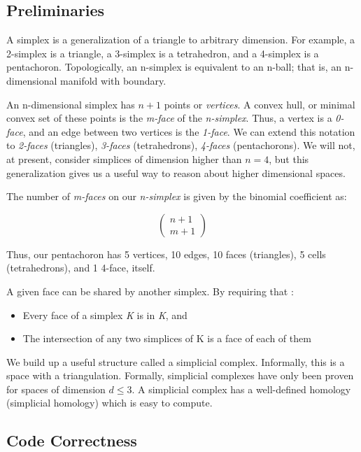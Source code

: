 \documentclass{article}
\begin{document}
\subsection{Preliminaries}

A simplex is a generalization of a triangle to arbitrary dimension. For example, a 2-simplex is a triangle, a 3-simplex is a tetrahedron, and a 4-simplex is a pentachoron. Topologically, an n-simplex is equivalent to an n-ball; that is, an n-dimensional manifold with boundary.

An n-dimensional simplex has $n+1$ points or \emph{vertices}. A convex hull, or minimal convex set of these points is the \emph{m-face} of the \emph{n-simplex}. Thus, a vertex is a \emph{0-face}, and an edge between two vertices is the \emph{1-face}. We can extend this notation to \emph{2-faces} (triangles), \emph{3-faces} (tetrahedrons), \emph{4-faces} (pentachorons). We will not, at present, consider simplices of dimension higher than $n=4$, but this generalization gives us a useful way to reason about higher dimensional spaces.

The number of \emph{m-faces} on our \emph{n-simplex} is given by the binomial coefficient as:

\begin{equation}
\left(\begin{array}{c}n+1\\m+1\end{array}\right)
\end{equation}

Thus, our pentachoron has 5 vertices, 10 edges, 10 faces (triangles), 5 cells (tetrahedrons), and 1 4-face, itself.

A given face can be shared by another simplex. By requiring that \cite{weisstein1}:

\begin{itemize}
\item Every face of a simplex \emph{K} is in \emph{K}, and
\item The intersection of any two simplices of K is a face of each of them
\end{itemize}

We build up a useful structure called a simplicial complex. Informally, this is a space with a triangulation. Formally, simplicial complexes have only been proven for spaces of dimension $d\le3$. A simplicial complex has a well-defined homology (simplicial homology) which is easy to compute.

\subsection{Code Correctness}
\end{document}
